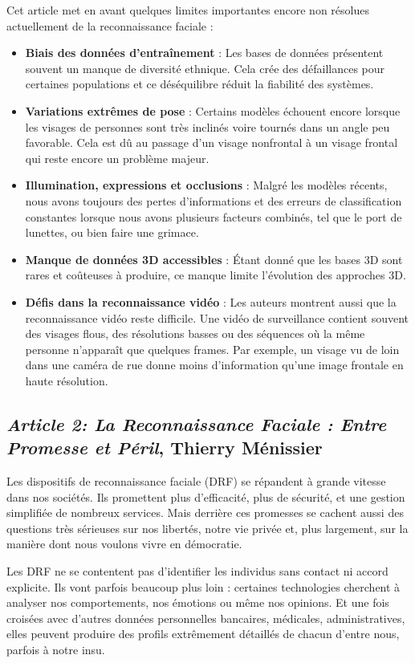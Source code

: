 \documentclass[11pt]{article}
\begin{document}
Cet article met en avant quelques limites importantes encore non résolues actuellement de la reconnaissance faciale :
\begin{itemize}
    \item \textbf{Biais des données d’entraînement} : Les bases de données présentent souvent un manque de diversité            
ethnique. Cela crée des défaillances pour certaines populations et ce déséquilibre réduit la fiabilité des          systèmes.
    \item \textbf{Variations extrêmes de pose} : Certains modèles échouent encore lorsque les visages de personnes sont très 
inclinés voire tournés dans un angle peu favorable. Cela est dû au passage d’un visage nonfrontal à un visage frontal qui reste 
encore un problème majeur.
    \item \textbf{Illumination, expressions et occlusions} : Malgré les modèles récents, nous avons toujours des pertes 
d’informations et des erreurs de classification constantes lorsque nous avons plusieurs facteurs combinés, tel que le port de 
lunettes, ou bien faire une grimace.
    \item \textbf{Manque de données 3D accessibles} : Étant donné que les bases 3D sont rares et coûteuses à produire, ce manque 
limite l’évolution des approches 3D.
    \item \textbf{Défis dans la reconnaissance vidéo} : Les auteurs montrent aussi que la reconnaissance vidéo reste difficile. 
Une vidéo de surveillance contient souvent des visages flous, des résolutions basses ou des séquences où la même personne 
n’apparaît que quelques frames. Par exemple, un visage vu de loin dans une caméra de rue donne moins d’information qu’une image 
frontale en haute résolution.
\end{itemize}

\subsection{\textit{Article 2: La Reconnaissance Faciale : Entre Promesse et Péril}, Thierry Ménissier}

Les dispositifs de reconnaissance faciale (DRF) se répandent à grande vitesse dans nos sociétés. Ils promettent plus 
d’efficacité, plus de sécurité, et une gestion simplifiée de nombreux services. Mais derrière ces promesses se cachent aussi des 
questions très sérieuses sur nos libertés, notre vie privée et, plus largement, sur la manière dont nous voulons vivre en 
démocratie.

Les DRF ne se contentent pas d’identifier les individus sans contact ni accord explicite. Ils vont parfois beaucoup plus loin : 
certaines technologies cherchent à analyser nos comportements, nos émotions ou même nos opinions. Et une fois croisées avec 
d’autres données personnelles bancaires, médicales, administratives, elles peuvent produire des profils extrêmement détaillés de 
chacun d’entre nous, parfois à notre insu.
\end{document}
